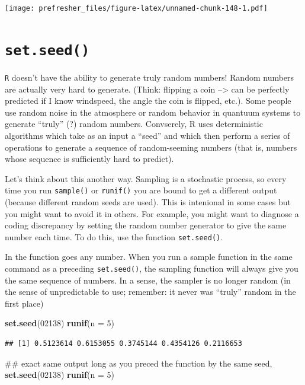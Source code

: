 \documentclass[]{book}
\newenvironment{Shaded}{\begin{snugshade}}{\end{snugshade}}
\newcommand{\KeywordTok}[1]{\textcolor[rgb]{0.13,0.29,0.53}{\textbf{#1}}}
\newcommand{\DataTypeTok}[1]{\textcolor[rgb]{0.13,0.29,0.53}{#1}}
\newcommand{\DecValTok}[1]{\textcolor[rgb]{0.00,0.00,0.81}{#1}}
\newcommand{\NormalTok}[1]{#1}
\theoremstyle{definition}
\theoremstyle{definition}
\theoremstyle{definition}
\theoremstyle{remark}
\begin{document}
\texttt{[image: prefresher\_files/figure-latex/unnamed-chunk-148-1.pdf]}

\section{\texorpdfstring{\texttt{set.seed()}}{set.seed()}}\label{set.seed}

\texttt{R} doesn't have the ability to generate truly random numbers!
Random numbers are actually very hard to generate. (Think: flipping a
coin --\textgreater{} can be perfectly predicted if I know windspeed,
the angle the coin is flipped, etc.). Some people use random noise in
the atmosphere or random behavior in quantuum systems to generate
``truly'' (?) random numbers. Convserely, R uses deterministic
algorithms which take as an input a ``seed'' and which then perform a
series of operations to generate a sequence of random-seeming numbers
(that is, numbers whose sequence is sufficiently hard to predict).

Let's think about this another way. Sampling is a stochastic process, so
every time you run \texttt{sample()} or \texttt{runif()} you are bound
to get a different output (because different random seeds are used).
This is intenional in some cases but you might want to avoid it in
others. For example, you might want to diagnose a coding discrepancy by
setting the random number generator to give the same number each time.
To do this, use the function \texttt{set.seed()}.

In the function goes any number. When you run a sample function in the
same command as a preceding \texttt{set.seed()}, the sampling function
will always give you the same sequence of numbers. In a sense, the
sampler is no longer random (in the sense of unpredictable to use;
remember: it never was ``truly'' random in the first place)

\begin{Shaded}
\begin{Highlighting}[]
\KeywordTok{set.seed}\NormalTok{(}\DecValTok{02138}\NormalTok{)}
\KeywordTok{runif}\NormalTok{(}\DataTypeTok{n =} \DecValTok{5}\NormalTok{)}
\end{Highlighting}
\end{Shaded}

\begin{verbatim}
## [1] 0.5123614 0.6153055 0.3745144 0.4354126 0.2116653
\end{verbatim}

\begin{Shaded}
\begin{Highlighting}[]
\NormalTok{## exact same output long as you preced the function by the same seed, }
\KeywordTok{set.seed}\NormalTok{(}\DecValTok{02138}\NormalTok{)}
\KeywordTok{runif}\NormalTok{(}\DataTypeTok{n =} \DecValTok{5}\NormalTok{)}
\end{Highlighting}
\end{Shaded}
\end{document}
